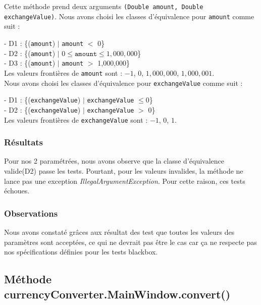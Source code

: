 \documentclass[11pt]{article}
\begin{document}
Cette méthode prend deux arguments \texttt{(Double amount, Double exchangeValue)}.
Nous avons choisi les classes d'équivalence pour \texttt{amount} comme suit :

    \hspace{-7mm}
    - D1 : \{(\texttt{amount}) $|$ \texttt{amount} $<$ 0\} \\
    - D2 : \{(\texttt{amount}) $|$ $0 \leq \texttt{amount} \leq 1,000,000$\} \\
    - D3 : \{(\texttt{amount}) $|$ \texttt{amount} $>$ 1,000,000\} \\
    
Les valeurs frontières de  \texttt{amount} sont : $-1$, $0$, $1,000,000$, $1,000,001$. \\

Nous avons choisi les classes d'équivalence pour \texttt{exchangeValue} comme suit :

    \hspace{-7mm}
    - D1 : \{(\texttt{exchangeValue}) $|$ \texttt{exchangeValue} $\leq 0$\} \\
    - D2 : \{(\texttt{exchangeValue}) $|$ \texttt{exchangeValue} $>$  0\} \\

Les valeurs frontières de \texttt{exchangeValue} sont : $-1$, $0$, $1$. \\
    
\subsubsection{Résultats}

Pour nos 2 paramétrées, nous avons observe que la classe d'équivalence valide(D2) passe les tests. Pourtant, pour les valeurs invalides, la méthode ne lance pas une exception \textit{IllegalArgumentException}.
Pour cette raison, ces tests échoues.


\subsubsection{Observations}
Nous avons constaté grâces aux résultat des test que toutes les valeurs des paramètres sont acceptées, ce qui ne devrait pas être le cas car ça ne respecte pas nos spécifications définies pour les tests blackbox.




\subsection{Méthode currencyConverter.MainWindow.convert()}
\end{document}
